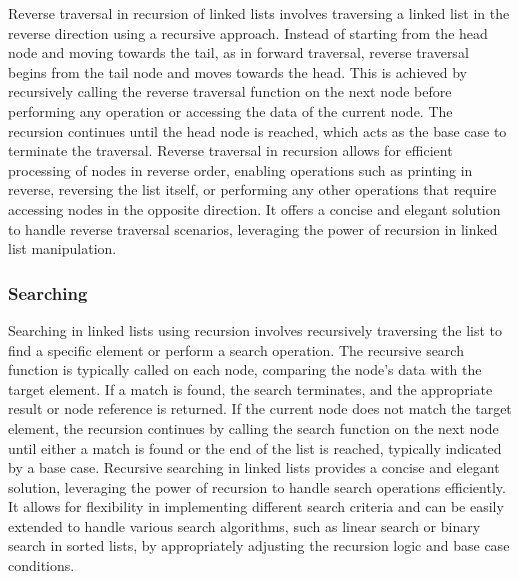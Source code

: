 Reverse traversal in recursion of linked lists involves traversing a linked list in the reverse direction using a recursive approach. Instead of starting from the head node and moving towards the tail, as in forward traversal, reverse traversal begins from the tail node and moves towards the head. This is achieved by recursively calling the reverse traversal function 
on the next node before performing any operation or accessing the data of the current node. The recursion continues until the head node is reached, which acts as the base case to terminate the traversal. Reverse traversal in recursion allows for efficient processing of nodes in reverse order, enabling operations such as printing in reverse, reversing the list itself, 
or performing any other operations that require accessing nodes in the opposite direction. It offers a concise and elegant solution to handle reverse traversal scenarios, leveraging the power of recursion in linked list manipulation.

\subsubsection{Searching}

Searching in linked lists using recursion involves recursively traversing the list to find a specific element or perform a search operation. The recursive search function is typically called on each node, comparing the node's data with the target element. If a match is found, the search terminates, and the appropriate result or node reference is returned. If the current 
node does not match the target element, the recursion continues by calling the search function on the next node until either a match is found or the end of the list is reached, typically indicated by a base case. Recursive searching in linked lists provides a concise and elegant solution, leveraging the power of recursion to handle search operations efficiently. It allows 
for flexibility in implementing different search criteria and can be easily extended to handle various search algorithms, such as linear search or binary search in sorted lists, by appropriately adjusting the recursion logic and base case conditions.


